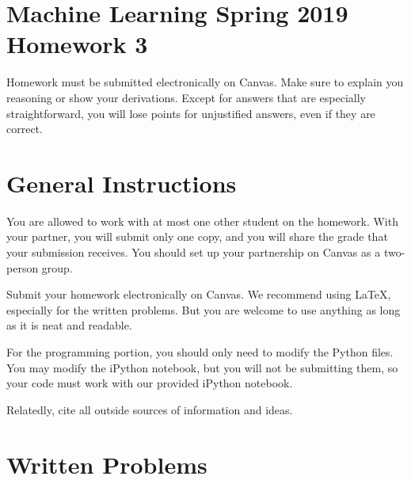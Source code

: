 \documentclass[10pt]{article}
\begin{document}
\section*{Machine Learning Spring 2019 Homework 3}

Homework must be submitted electronically on Canvas. Make sure to explain you reasoning or show your derivations. Except for answers that are especially straightforward, you will lose points for unjustified answers, even if they are correct. 

\section*{General Instructions}

You are allowed to work with at most one other student on the homework. With your partner, you will submit only one copy, and you will share the grade that your submission receives. You should set up your partnership on Canvas as a two-person group. 

Submit your homework electronically on Canvas. We recommend using LaTeX, especially for the written problems. But you are welcome to use anything as long as it is neat and readable. 

For the programming portion, you should only need to modify the Python files. You may modify the iPython notebook, but you will not be submitting them, so your code must work with our provided iPython notebook.

Relatedly, cite all outside sources of information and ideas. 

\section*{Written Problems}
\end{document}
